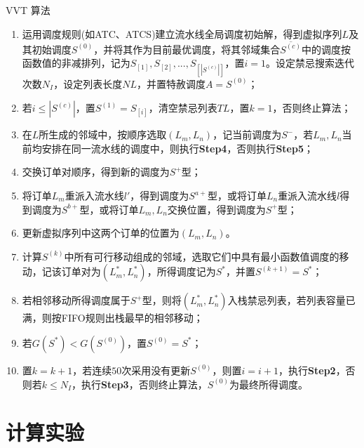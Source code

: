 \documentclass{beamer}
\newcommand{\Step}[1]{\textbf{Step#1}}
\begin{document}
\begin{frame}
\tiny
\begin{exampleblock}{VVT 算法}
\begin{enumerate}[\bf Step1]
\item 运用调度规则(如ATC、ATCS)建立流水线全局调度初始解，得到虚拟序列$L$及其初始调度$S^{(0)}$，并将其作为目前最优调度，将其邻域集合$\overline{S^{(c)}}$中的调度按函数值的非减排列，记为$S_{[1]},S_{[2]},...,S_{[|S^{(c)}|]}$，置$i = 1$。设定禁忌搜索迭代次数$N_I$，设定列表长度$NL$，并置特赦调度$A = S^{(0)}$；
\item 若$i \le |S^{(c)}|$，置$S^{(1)} = S_{[i]}$，清空禁忌列表$TL$，置$k = 1$，否则终止算法；
\item 在$L$所生成的邻域中，按顺序选取$(L_m, L_n)$，记当前调度为$S^-$，若$L_m, L_n$当前均安排在同一流水线的调度中，则执行\Step{4}，否则执行\Step{5}；
\item 交换订单对顺序，得到新的调度为$S^+$型；
\item 将订单$L_m$重派入流水线$l'$，得到调度为$S^{a+}$型，或将订单$L_n$重派入流水线$l$得到调度为$S^{b+}$型，或将订单$L_m, L_n$交换位置，得到调度为$S^+$型；
\item 更新虚拟序列中这两个订单的位置为$(L_m, L_n)$。
\item 计算$S^{(k)}$中所有可行移动组成的邻域，选取它们中具有最小函数值调度的移动，记该订单对为$(L_m^*, L_n^*)$，所得调度记为$S^*$，并置$S^{(k+1)} = S^*$；
\item 若相邻移动所得调度属于$S^+$型，则将$(L_m^*, L_n^*)$入栈禁忌列表，若列表容量已满，则按FIFO规则出栈最早的相邻移动；
\item 若$G(S^*) < G(S^{(0)})$，置$S^{(0)} = S^*$；
\item 置$k = k + 1$，若连续$50$次采用没有更新$S^{(0)}$，则置$i = i+1$，执行\Step{2}，否则若$k\le N_I$，执行\Step{3}，否则终止算法，$S^{(0)}$为最终所得调度。
\end{enumerate}
\end{exampleblock}
\end{frame}

\section{计算实验}
\end{document}

